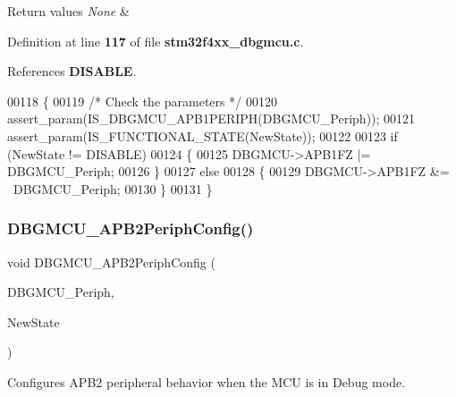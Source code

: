 \begin{DoxyRetVals}{Return values}
{\em None} & \\
\hline
\end{DoxyRetVals}


Definition at line \textbf{ 117} of file \textbf{ stm32f4xx\+\_\+dbgmcu.\+c}.



References \textbf{ D\+I\+S\+A\+B\+LE}.


\begin{DoxyCode}
00118 \{
00119   \textcolor{comment}{/* Check the parameters */}
00120   assert_param(IS_DBGMCU_APB1PERIPH(DBGMCU\_Periph));
00121   assert_param(IS_FUNCTIONAL_STATE(NewState));
00122 
00123   \textcolor{keywordflow}{if} (NewState != DISABLE)
00124   \{
00125     DBGMCU->APB1FZ |= DBGMCU\_Periph;
00126   \}
00127   \textcolor{keywordflow}{else}
00128   \{
00129     DBGMCU->APB1FZ &= ~DBGMCU\_Periph;
00130   \}
00131 \}
\end{DoxyCode}
\mbox{\label{group__DBGMCU__Private__Functions_ga2f5ed438cada1be09ea51c42419be3a8}} 
\subsubsection{D\+B\+G\+M\+C\+U\+\_\+\+A\+P\+B2\+Periph\+Config()}
{\footnotesize\ttfamily void D\+B\+G\+M\+C\+U\+\_\+\+A\+P\+B2\+Periph\+Config (\begin{DoxyParamCaption}\item[{uint32\+\_\+t}]{D\+B\+G\+M\+C\+U\+\_\+\+Periph,  }\item[{\textbf{ Functional\+State}}]{New\+State }\end{DoxyParamCaption})}



Configures A\+P\+B2 peripheral behavior when the M\+CU is in Debug mode. 


